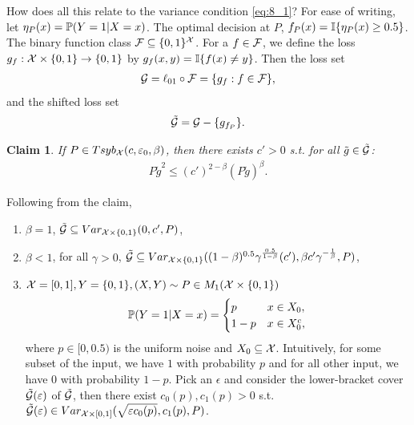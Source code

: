 \documentclass[twoside]{article}
\newtheorem{claim}[theorem]{Claim}
\begin{document}
How does all this relate to the variance condition \cref{eq:8_1}?  For ease of writing, let $\eta_P(x) = \mathbb{P}(Y= 1 | X=x)$.  The optimal decision at $P$, $f_P(x) = \mathbb{I}\{ \eta_P(x) \geq 0.5 \}$.  The binary function class $\mathcal{F} \subseteq \{0, 1\}^{\mathcal{X}}$.  For a $f \in \mathcal{F}$, we define the loss $g_f: \mathcal{X} \times \{0,1\} \to\{ 0, 1\}$ by $g_f(x,y) = \mathbb{I}\{f(x) \neq y\}$.  Then the loss set
\begin{align}
    \mathcal{G} = \ell_{01} \circ \mathcal{F} = \{g_f : f \in \mathcal{F} \},
\end{align}
and the shifted loss set 
\begin{align}
    \tilde {\mathcal{G}} = \mathcal{G} - \{g_{f_P}\}.
\end{align}
\begin{claim}   
    If $P \in Tsyb_{\mathcal{X}}(c, \varepsilon_0, \beta)$, then there exists $c' > 0$ s.t. for all $\tilde g \in \tilde {\mathcal{G}}$:
    \begin{align}
        P \tilde g^2 \leq (c')^{2 - \beta} ( P\tilde g)^{\beta}.
    \end{align}
\end{claim}
Following from the claim,  
\begin{enumerate}
    \item $\beta = 1$, $\tilde {\mathcal{G}} \subseteq Var_{\mathcal{X} \times \{0,1\}}(0, c', P)$, \\
    \item $\beta < 1$, for all $\gamma > 0$,
    $\tilde {\mathcal{G}} \subseteq Var_{\mathcal{X} \times \{0,1\}}((1-\beta)^{0.5} \gamma^{\frac{0.5}{1-\beta}}(c'), \beta c' \gamma^{-\frac{1}{\beta}}, P)$, \\
    \item $\mathcal{X} = [0,1], Y = \{0, 1\}, (X,Y) \sim P \in M_1(\mathcal{X} \times \{0,1\})$ 
    \begin{align}
        \mathbb{P}(Y=1 | X = x) = \begin{cases}
            p & x \in X_0, \\
            1-p & x \in X_0^c,
        \end{cases}
    \end{align}
    where $p \in [0, 0.5)$ is the uniform noise and $X_0 \subseteq \mathcal{X}$.  Intuitively, for some subset of the input, we have $1$ with probability $p$ and for all other input, we have $0$ with probability $1-p$.  Pick an $\epsilon$ and consider the lower-bracket cover $\tilde {\mathcal{G}}(\varepsilon)$ of $\tilde {\mathcal{G}}$, then there exist $c_0(p), c_1(p)> 0$ s.t. $\tilde {\mathcal{G}}(\varepsilon) \in Var_{\mathcal{X} \times [0,1]}( \sqrt{\varepsilon c_0(p)}, c_1(p), P)$.  
\end{enumerate}
\end{document}
